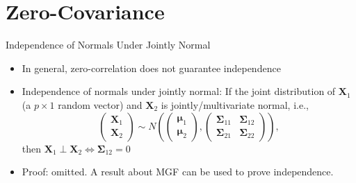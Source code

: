\documentclass[
  ignorenonframetext,
]{beamer}
\begin{document}
\hypertarget{zero-covariance}{%
\section{Zero-Covariance}\label{zero-covariance}}

\begin{frame}{Independence of Normals Under Jointly Normal}
\protect\hypertarget{independence-of-normals-under-jointly-normal}{}
\begin{itemize}
\item
  In general, zero-correlation does not guarantee independence
\item
  Independence of normals under jointly normal: If the joint
  distribution of \(\mathbf X_1\) (a \(p\times 1\) random vector) and
  \(\mathbf X_2\) is jointly/multivariate normal, i.e., \[
  \begin{pmatrix}\mathbf X_1 \\ \mathbf X_2
  \end{pmatrix} \sim N(
  \begin{pmatrix}\boldsymbol \mu_1\\\boldsymbol \mu_2\end{pmatrix},
  \begin{pmatrix}\boldsymbol \Sigma_{11} & \boldsymbol \Sigma_{12}\\ \boldsymbol \Sigma_{21} & \boldsymbol \Sigma_{22}\end{pmatrix}),
  \] then
  \(\mathbf X_1 \perp \mathbf X_2 \Leftrightarrow \boldsymbol \Sigma_{12}=0\)
\item
  Proof: omitted. A result about MGF can be used to prove independence.
\end{itemize}
\end{frame}
\end{document}

